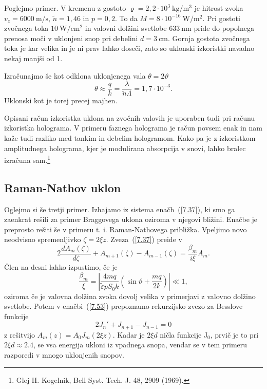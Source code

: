 Poglejmo primer. V kremenu z gostoto $\varrho=2,2\cdot10^{3}~\si{\kilo\gram/\metre^3}$ 
je hitrost zvoka $v_{z}=6000~\si{\metre/\second}$,
$\tilde{n}=1,46$ in $p=0,2$. To da $M=8\cdot10^{-16}~\si{\watt/\metre^2}$.
Pri gostoti zvočnega toka $10~\si{\watt/\centi\metre^2}$ in valovni dolžini svetlobe 
$633~\si{\nano\metre}$ pride do popolnega prenosa moči v uklonjeni snop pri 
debelini $d=3~\si{\centi\metre}$. Gornja gostota
zvočnega toka je kar velika in je ni prav lahko doseči, zato so 
uklonski izkoristki navadno nekaj manjši od 1.

Izračunajmo še kot odklona uklonjenega vala $\theta = 2 \vartheta$  
\begin{equation}
\theta \approx \frac{q}{k}=\frac{\lambda}{\tilde{n}\Lambda}=1,7\cdot10^{-3}.
\label{7.52}
\end{equation}
Uklonski kot je torej precej majhen.

\begin{remark}
Opisani račun izkoristka uklona na zvočnih valovih je uporaben tudi
pri računu izkoristka holograma. V primeru faznega holograma je račun
povsem enak in nam kaže tudi razliko med tankim in debelim hologramom.
Kako pa je z izkoristkom amplitudnega holograma, kjer je modulirana
absorpcija v snovi, lahko bralec izračuna sam.\footnote{Glej H. Kogelnik, Bell Syst. Tech. J.
48, 2909 (1969).}
\end{remark}

\subsection*{Raman-Nathov uklon}
Oglejmo si še tretji primer. Izhajamo iz sistema enačb~(\ref{7.37}), ki smo ga 
zaenkrat rešili za primer Braggovega uklona oziroma v njegovi bližini. 
Enačbe je preprosto rešiti še v primeru t. i. Raman-Nathovega približka. 
Vpeljimo novo neodvisno spremenljivko $\zeta=2\xi z$. 
Zveza~(\ref{7.37})
preide v 
\begin{equation}
2\frac{dA_{m}(\zeta)}{d\zeta}+A_{m+1}(\zeta)-A_{m-1}(\zeta)=\frac{\beta_{m}}{i\xi}A_{m}.
\label{7.53}
\end{equation}
 Člen na desni lahko izpustimo, če je 
\begin{equation}
\frac{\beta_{m}}{\xi}=\left| \frac{4mq}{\tilde{\varepsilon}pS_0k}(\sin\vartheta+\frac{mq}{2k})\right| 
\ll 1,
\label{7.54}
\end{equation}
oziroma če je valovna dolžina zvoka dovolj velika v primerjavi z valovno dolžino svetlobe. Potem 
v enačbi~(\ref{7.53}) prepoznamo rekurzijsko zvezo za Besslove funkcije 
\begin{equation}
2J_{n}'+J_{n+1}-J_{n-1}=0
\label{7.55}
\end{equation}
z rešitvijo $A_{m}(z)=A_{0}J_{m}(2\xi z)$. Kadar je $2\xi d$ ničla funkcije
J$_{0}$, prvič je to pri $2\xi d\approx 2.4$, se vsa energija ukloni iz
vpadnega snopa, vendar se v tem primeru 
razporedi v mnogo uklonjenih snopov.

